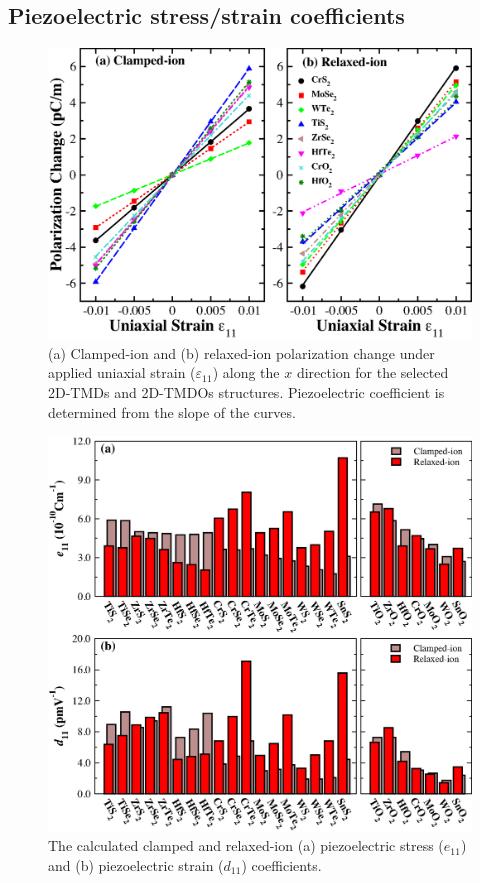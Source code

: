 \subsection{Piezoelectric stress/strain coefficients}\label{piezo}

\begin{figure}[htbp]
\centering
\includegraphics[width=0.8\linewidth]{polariz.eps}
\caption{\label{fig:polariz} (a) Clamped-ion and (b) relaxed-ion polarization change under applied uniaxial strain ($\varepsilon_{11}$) along the $x$ direction for the selected 2D-TMDs and 2D-TMDOs structures. Piezoelectric coefficient is determined from the slope of the curves.}
\end{figure}

\begin{figure}[t]
\centering
\includegraphics[width=0.8\linewidth]{piezo_res.eps}
\caption{\label{fig:piezo_res}The calculated clamped and relaxed-ion (a) piezoelectric stress ($e_{11}$)  and (b) piezoelectric strain ($d_{11}$) coefficients.}
\end{figure}

